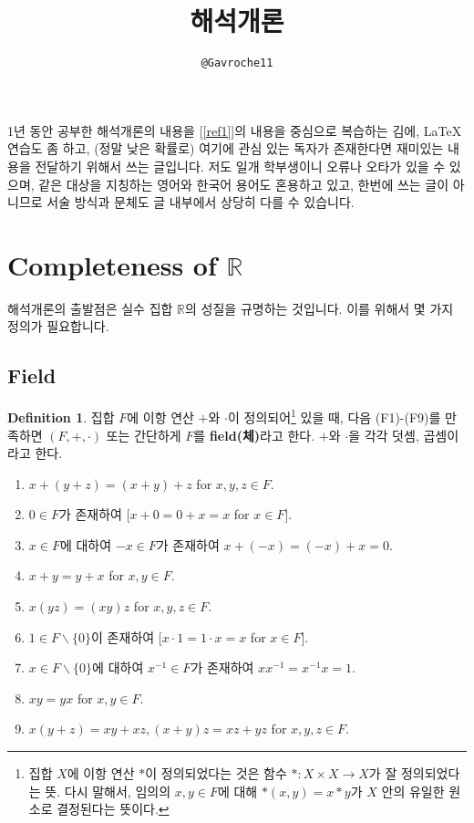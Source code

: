 \documentclass[12pt]{article}
\title{해석개론}
\author{\texttt{@Gavroche11}}
\theoremstyle{definition}
\newtheorem{defn}[thm]{Definition}
\def\RR{\mathbb{R}}
\begin{document}
\maketitle

\tableofcontents
\newpage


1년 동안 공부한 해석개론의 내용을 [\ref{ref1}]\과 [\ref{ref2}]의 내용을 중심으로 복습하는 김에, {\LaTeX} 연습도 좀 하고, (정말 낮은 확률로) 여기에 관심 있는 독자가 존재한다면 재미있는 내용을 전달하기 위해서 쓰는 글입니다. 저도 일개 학부생이니 오류나 오타가 있을 수 있으며, 같은 대상을 지칭하는 영어와 한국어 용어도 혼용하고 있고, 한번에 쓰는 글이 아니므로 서술 방식과 문체도 글 내부에서 상당히 다를 수 있습니다.

\section{Completeness of \(\RR\)}

해석개론의 출발점은 실수 집합 \(\RR\)의 성질을 규명하는 것입니다. 이를 위해서 몇 가지 정의가 필요합니다.

\subsection{Field}

	\begin{defn}
		집합 \(F\)에 이항 연산 \(+\)와 \(\cdot\)이 정의되어\footnote{집합 \(X\)에 이항 연산 \(*\)이 정의되었다는 것은 함수 \(*: X \times X \rightarrow X\)가 잘 정의되었다는 뜻. 다시 말해서, 임의의 \(x, y \in F\)에 대해 \(*(x, y) = x * y\)가 \(X\) 안의 유일한 원소로 결정된다는 뜻이다.} 있을 때, 다음 (F1)-(F9)를 만족하면 \((F, +, \cdot)\) 또는 간단하게 \(F\)를 \textbf{field(체)}라고 한다. \(+\)와 \(\cdot\)을 각각 덧셈, 곱셈이라고 한다.
		\begin{enumerate} [label=(F\arabic*), leftmargin=2\parindent]
			\item
			\(x + (y+z) = (x+y)+z\) for \(x, y, z \in F\).
			\item
			\(0 \in F\)가 존재하여 [\(x+0=0+x=x\) for \(x \in F\)].
			\item
			\(x \in F\)에 대하여 \(-x \in F\)가 존재하여 \mbox{\(x+(-x)=(-x)+x=0\).}
			\item
			\(x+y=y+x\) for \(x, y \in F\).
			\item
			\(x(yz)=(xy)z\) for \(x, y, z \in F\).
			\item
			\(1 \in F \backslash \{0\}\)이 존재하여 [\(x\cdot 1=1 \cdot x=x\) for \(x \in F\)].
			\item
			\(x \in F \backslash \{0\}\)에 대하여 \(x^{-1} \in F\)가 존재하여 \(xx^{-1}=x^{-1}x=1\).
			\item
			\(xy=yx\) for \(x, y \in F\).
			\item
			\(x(y+z)=xy+xz, (x+y)z = xz+yz\) for \(x, y, z \in F\).
		\end{enumerate}
	\end{defn}
	
\end{document}
